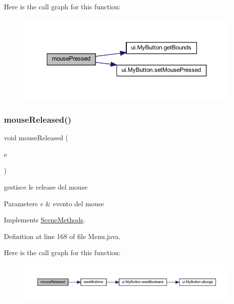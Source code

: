 Here is the call graph for this function\+:\nopagebreak
\begin{figure}[H]
\begin{center}
\leavevmode
\includegraphics[width=349pt]{classscenes_1_1_menu_aed82e1ce3dd3cf283d508c3ba3be70ef_cgraph}
\end{center}
\end{figure}
\mbox{\label{classscenes_1_1_menu_a87a07291794e15052db67f945d90853e}} 
\subsubsection{\texorpdfstring{mouse\+Released()}{mouseReleased()}}
{\footnotesize\ttfamily void mouse\+Released (\begin{DoxyParamCaption}\item[{Mouse\+Event}]{e }\end{DoxyParamCaption})}



gestisce le release del mouse 


\begin{DoxyParams}{Parameters}
{\em e} & evento del mouse \\
\hline
\end{DoxyParams}


Implements \hyperlink{interfacescenes_1_1_scene_methods_a87a07291794e15052db67f945d90853e}{Scene\+Methods}.



Definition at line 168 of file Menu.\+java.

Here is the call graph for this function\+:\nopagebreak
\begin{figure}[H]
\begin{center}
\leavevmode
\includegraphics[width=350pt]{classscenes_1_1_menu_a87a07291794e15052db67f945d90853e_cgraph}
\end{center}
\end{figure}
\mbox{\label{classscenes_1_1_menu_a203b6ad9d5e4d54dd1152986eec4dedc}} 
